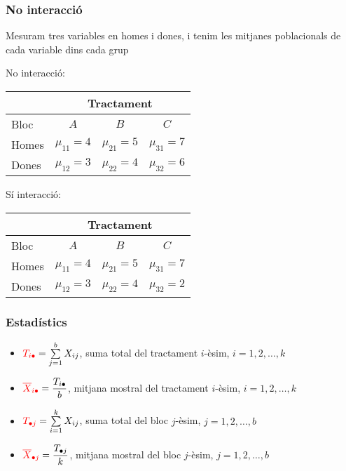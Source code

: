 \documentclass[12pt,t]{beamer}
\newcommand{\red}[1]{\textcolor{red}{#1}}
\renewcommand{\emph}[1]{{\color{red}#1}}
\theoremstyle{plain}
\theoremstyle{definition}
\begin{document}
\begin{frame}
\frametitle{No interacció}

Mesuram tres variables en homes i dones, i tenim les mitjanes poblacionals de cada variable dins cada grup
\medskip

\emph{No interacció:}
\begin{center}
\begin{tabular}{lccc}
\hline
&\multicolumn{3}{c}{Tractament}\\\hline
Bloc&$A$&$B$&$C$\\\hline
Homes&$\mu_{11}=4$&$\mu_{21}=5$&$\mu_{31}=7$\\
Dones&$\mu_{12}=3$&$\mu_{22}=4$&$\mu_{32}=6$\\\hline
\end{tabular}
\end{center}
\medskip

\emph{Sí interacció:}
\begin{center}
\begin{tabular}{lccc}
\hline
&\multicolumn{3}{c}{Tractament}\\\hline
Bloc&$A$&$B$&$C$\\\hline
Homes&$\mu_{11}=4$&$\mu_{21}=5$&$\mu_{31}=7$\\
Dones&$\mu_{12}=3$&$\mu_{22}=4$&$\mu_{32}=2$\\\hline
\end{tabular}
\end{center}

\end{frame}


\begin{frame}
\frametitle{Estadístics}
\begin{itemize}
\item $\red{T_{i\bullet}} = \sum\limits_{j=1}^b X_{ij}$, suma total del tractament $i$-èsim, $i=1,2,\ldots,k$
\medskip

\item $\red{\overline{X}_{i\bullet}} =\dfrac{T_{i\bullet}}{b}$, mitjana mostral del tractament $i$-èsim, $i=1,2,\ldots,k$
\medskip


\item $\red{T_{\bullet j}}=\sum\limits_{i=1}^k X_{ij}$, suma total del bloc $j$-èsim,  $j=1,2,\ldots,b$
\medskip

\item $\red{\overline{X}_{\bullet j}} =\dfrac{T_{\bullet j}}{k}$, mitjana mostral del bloc $j$-èsim,  $j=1,2,\ldots,b$

\end{itemize}
\end{frame}
\end{document}
